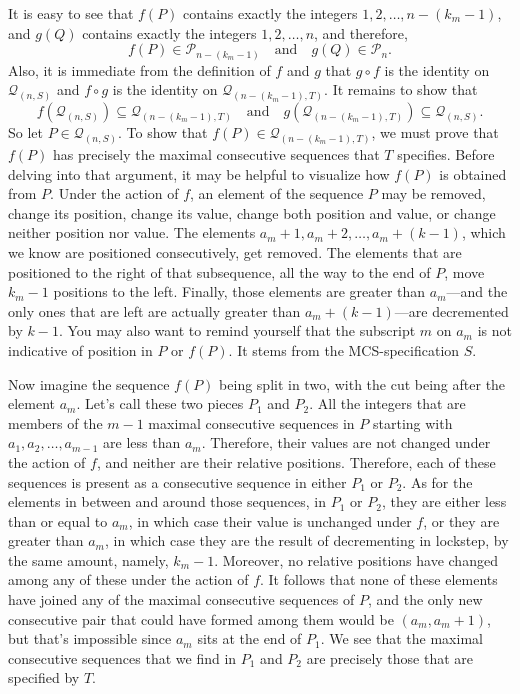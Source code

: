 \documentclass{article}
\begin{document}
It is easy to see that $f(P)$ contains exactly the integers $1, 2, \ldots, n-(k_m-1)$, and $g(Q)$ contains
exactly the integers $1, 2, \ldots, n$, and therefore,
$$
f(P)\in {\mathcal P}_{n-(k_m-1)}
\quad\text{and}\quad
g(Q)\in {\mathcal P}_n.
$$
Also, it is immediate from the definition of $f$ and $g$ that $g\circ f$ is the
identity on ${\mathcal Q}_{(n,S)}$ and $f\circ g$ is the identity on ${\mathcal Q}_{(n-(k_m-1),T)}$.
It remains to show that
$$
f({\mathcal Q}_{(n,S)}) \subseteq {\mathcal Q}_{(n-(k_m-1),T)}
\quad \text{and}\quad
g({\mathcal Q}_{(n-(k_m-1),T)}) \subseteq {\mathcal Q}_{(n,S)}.
$$
So let $P\in {\mathcal Q}_{(n,S)}$. To show that $f(P)\in {\mathcal Q}_{(n-(k_m-1),T)}$, we must prove
that $f(P)$ has precisely the maximal consecutive sequences that $T$ specifies. Before delving into that argument,
it may be helpful to visualize how $f(P)$ is obtained from $P$. Under the action of $f$, an element of the
sequence $P$ may be removed, change its position, change its value, change both position and value,
or change neither position nor value. The elements $a_m + 1, a_m + 2, \ldots, a_m + (k -1)$, which we know
are positioned consecutively, get removed. The elements that are positioned to the right of that subsequence,
all the way to the end of $P$, move $k_m - 1$ positions to the left. Finally, those elements are greater than
$a_m$---and the only ones that are left are actually greater than $a_m + (k -1)$---are decremented by $k-1$.
You may also want to remind yourself that the subscript $m$ on $a_m$ is not indicative of position in
$P$ or $f(P)$. It stems from the MCS-specification $S$.

Now imagine the sequence $f(P)$ being split in two, with the cut being after the element
$a_m$. Let's call these two pieces $P_1$ and $P_2$. All the integers that are members of the $m-1$ maximal
consecutive sequences in $P$ starting with $a_1, a_2, \ldots, a_{m-1}$ are less than $a_m$. Therefore,
their values are not changed under the action of $f$, and neither are their relative positions.
Therefore, each of these sequences is present as a consecutive sequence in either $P_1$ or $P_2$. 
As for the elements in between and around those sequences, in $P_1$ or $P_2$,
they are either less than or equal to $a_m$,
in which case their value is unchanged under $f$, or they are greater than $a_m$, in which case they are
the result of decrementing in lockstep, by the same amount, namely, $k_m -1$. Moreover, no relative positions
have changed among any of these under the action of $f$. It follows that none of these elements
have joined any of the maximal consecutive sequences of $P$, and the only new consecutive pair that
could have formed among them would be $(a_m, a_m+1)$, but that's impossible since $a_m$ sits at the
end of $P_1$. We see that the maximal consecutive sequences that we find in $P_1$ and $P_2$ are precisely those
that are specified by $T$.
\end{document}
